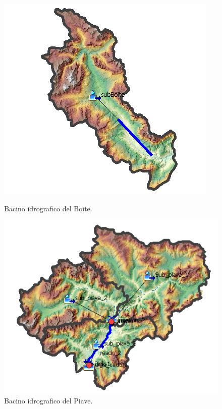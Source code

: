 \begin{figure}[H] \centering
    \begin{minipage}[]{7cm}
        \includegraphics[scale=0.73]{immagini/bac_boite.PNG}
        \caption{Bacino idrografico del Boite.}
    \label{minipage:bacino_boite}    
    \end{minipage}
        \hspace{2cm}
    \begin{minipage}[]{7cm}
        \includegraphics[scale=0.75]{immagini/bac_piave.PNG}
        \caption{Bacino idrografico del Piave.}
    \label{minipage:bacino_piave}
    \end{minipage} 
        \end{figure}


